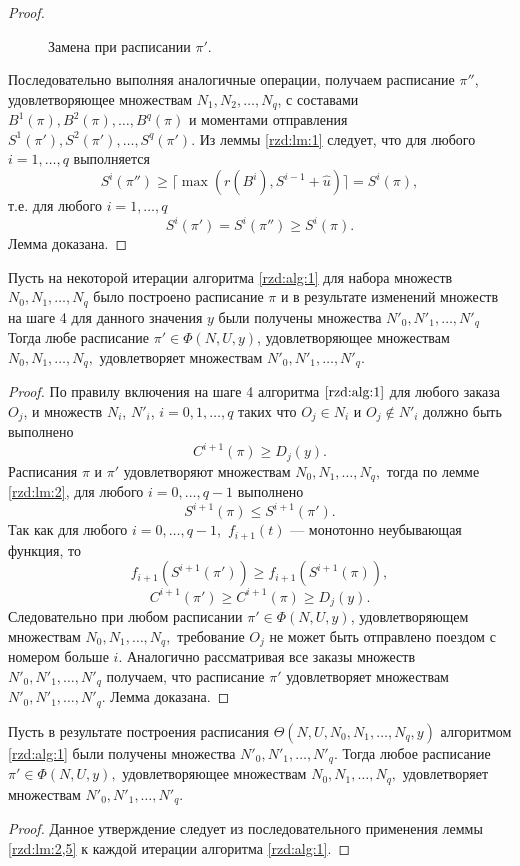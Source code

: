 \begin{proof}
\begin{figure}[h!]
\caption{Замена при расписании $\pi'$.}
\label{rzd:pic:6}
\end{figure}

Последовательно выполняя аналогичные операции, получаем расписание $\pi''$, удовлетворяющее множествам $N_1, N_2, \dots, N_q$, с составами $B^1(\pi), B^2(\pi), \dots, B^q(\pi)$ и моментами отправления $S^1(\pi'), S^2(\pi'), \dots, S^q(\pi')$. Из леммы \ref{rzd:lm:1} следует, что для любого $ i=1,\dots, q$ выполняется
$$S^i(\pi'') \geq \lceil \max(r(B^i), S^{i-1} + \widehat{u}) \rceil = S^i(\pi),$$
т.е. для любого $i=1, \dots, q$
$$S^i(\pi') = S^i(\pi'') \geq S^i(\pi).$$
Лемма доказана.
\end{proof}

\begin{lemma}\label{rzd:lm:2,5}
Пусть на некоторой итерации алгоритма \ref{rzd:alg:1} для набора множеств $N_0, N_1, \dots, N_q$ было построено расписание $\pi$ и в результате изменений множеств на шаге 4 для данного значения $y$ были получены множества $N'_0, N'_1, \dots, N'_q$ Тогда любе расписание $\pi' \in \Phi(N,U,y)$, удовлетворяющее множествам $N_0, N_1, \dots, N_q,$ удовлетворяет множествам $N'_0, N'_1, \dots, N'_q.$
\end{lemma}
\begin{proof}
По правилу включения на шаге 4 алгоритма $\ref{rzd:alg:1}$ для любого заказа $O_j$, и множеств $N_i$, $N'_i$, $i=0, 1, \dots, q$ таких что $O_j \in N_i$ и $O_j \notin N'_i$ должно быть выполнено
$$C^{i+1}(\pi) \geq D_j(y).$$
Расписания $\pi$ и $\pi'$ удовлетворяют множествам $N_0, N_1, \dots, N_q,$ тогда по лемме \ref{rzd:lm:2}, для любого $i=0, \dots, q-1$ выполнено
$$S^{i+1}(\pi) \leq S^{i+1}(\pi').$$
Так как для любого $i=0, \dots, q-1,$ $f_{i+1}(t)$ --- монотонно неубывающая функция, то
$$f_{i+1}(S^{i+1}(\pi')) \geq f_{i+1}(S^{i+1}(\pi)),$$
$$C^{i+1}(\pi') \geq C^{i+1}(\pi) \geq D_j(y).$$
Следовательно при любом расписании $\pi' \in \Phi(N,U,y)$, удовлетворяющем множествам $N_0, N_1, \dots, N_q,$ требование $O_j$ не может быть отправлено поездом с номером больше $i$. Аналогично рассматривая все заказы множеств $N'_0, N'_1, \dots, N'_q$ получаем, что расписание $\pi'$ удовлетворяет множествам $N'_0, N'_1, \dots, N'_q$. Лемма доказана.
\end{proof}

\begin{corollary}\label{rzd:col:1}
Пусть в результате построения расписания $\Theta(N,U,N_0, N_1, \dots, N_q, y)$ алгоритмом \ref{rzd:alg:1} были получены множества $N'_0, N'_1, \dots, N'_q$. Тогда любое расписание $\pi' \in \Phi(N,U,y),$ удовлетворяющее множествам $N_0, N_1, \dots, N_q,$ удовлетворяет множествам $N'_0, N'_1, \dots, N'_q.$
\end{corollary}
\begin{proof}
Данное утверждение следует из последовательного применения леммы \ref{rzd:lm:2,5} к каждой итерации алгоритма \ref{rzd:alg:1}.
\end{proof}

